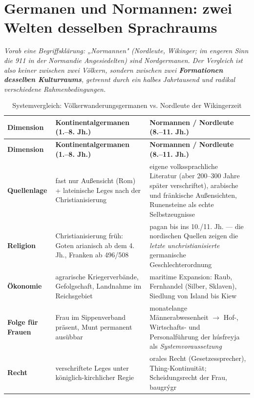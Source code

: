 \documentclass[11pt,a4paper,ngerman]{scrartcl}
\begin{document}
\section{Germanen und Normannen: zwei Welten desselben Sprachraums}

\noindent\textit{Vorab eine Begriffsklärung: „Normannen" (Nordleute, Wikinger; im engeren Sinn die 911 in der Normandie Angesiedelten) \emph{sind} Nordgermanen. Der Vergleich ist also keiner zwischen zwei Völkern, sondern zwischen zwei \textbf{Formationen desselben Kulturraums}, getrennt durch ein halbes Jahrtausend und radikal verschiedene Rahmenbedingungen.}
\medskip

\begin{small}
\begin{longtable}{>{\raggedright\arraybackslash}p{}>{\raggedright\arraybackslash}p{}>{\raggedright\arraybackslash}p{}}
\caption{Systemvergleich: Völkerwanderungsgermanen vs. Nordleute der Wikingerzeit}\\
\toprule
\textbf{Dimension} & \textbf{Kontinentalgermanen (1.–8. Jh.)} & \textbf{Normannen / Nordleute (8.–11. Jh.)} \\
\midrule
\endfirsthead
\toprule
\textbf{Dimension} & \textbf{Kontinentalgermanen (1.–8. Jh.)} & \textbf{Normannen / Nordleute (8.–11. Jh.)} \\
\midrule
\endhead
\textbf{Quellenlage} & fast nur Außensicht (Rom) + lateinische Leges nach der Christianisierung & eigene volkssprachliche Literatur (aber 200–300 Jahre später verschriftet), arabische und fränkische Außensichten, Runensteine als echte Selbstzeugnisse \\
\addlinespace[2pt]
\textbf{Religion} & Christianisierung früh: Goten arianisch ab dem 4. Jh., Franken ab 496/508 & pagan bis ins 10./11. Jh. — die nordischen Quellen zeigen die \emph{letzte unchristianisierte} germanische Geschlechterordnung \\
\addlinespace[2pt]
\textbf{Ökonomie} & agrarische Kriegerverbände, Gefolgschaft, Landnahme im Reichsgebiet & maritime Expansion: Raub, Fernhandel (Silber, Sklaven), Siedlung von Island bis Kiew \\
\addlinespace[2pt]
\textbf{Folge für Frauen} & Frau im Sippenverband präsent, Munt permanent ausübbar & monatelange Männerabwesenheit \(\rightarrow\) Hof-, Wirtschafts- und Personalführung der húsfreyja als \emph{Systemvoraussetzung} \\
\addlinespace[2pt]
\textbf{Recht} & verschriftete Leges unter königlich-kirchlicher Regie & orales Recht (Gesetzessprecher), Thing-Kontinuität; Scheidungsrecht der Frau, baugrýgr \\

\end{longtable}
\end{small}
\end{document}
